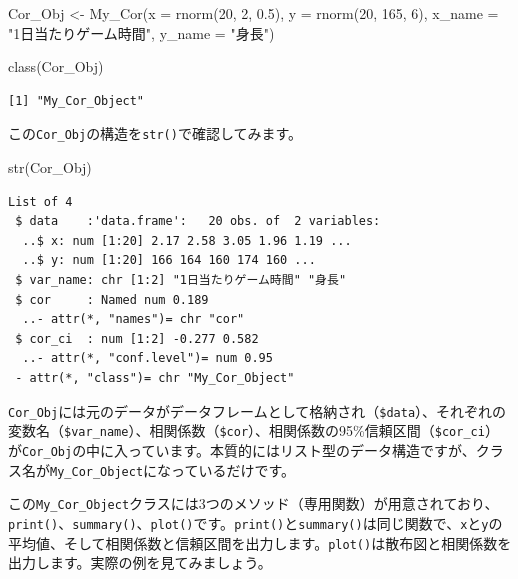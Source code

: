 \documentclass[
  a4paper,
  pandoc,
  ja=standard,
  jafont=haranoaji]{bxjsbook}
\newenvironment{Shaded}{\begin{snugshade}}{\end{snugshade}}
\newcommand{\AttributeTok}[1]{\textcolor[rgb]{0.00,0.48,0.65}{#1}}
\newcommand{\DecValTok}[1]{\textcolor[rgb]{0.68,0.00,0.00}{#1}}
\newcommand{\FloatTok}[1]{\textcolor[rgb]{0.68,0.00,0.00}{#1}}
\newcommand{\FunctionTok}[1]{\textcolor[rgb]{0.28,0.35,0.67}{#1}}
\newcommand{\NormalTok}[1]{\textcolor[rgb]{0.00,0.48,0.65}{#1}}
\newcommand{\OtherTok}[1]{\textcolor[rgb]{0.00,0.48,0.65}{#1}}
\newcommand{\StringTok}[1]{\textcolor[rgb]{0.13,0.47,0.30}{#1}}
\begin{document}
\begin{Shaded}
\begin{Highlighting}[numbers=left,,]
\NormalTok{Cor\_Obj }\OtherTok{\textless{}{-}} \FunctionTok{My\_Cor}\NormalTok{(}\AttributeTok{x      =} \FunctionTok{rnorm}\NormalTok{(}\DecValTok{20}\NormalTok{, }\DecValTok{2}\NormalTok{, }\FloatTok{0.5}\NormalTok{), }
                  \AttributeTok{y      =} \FunctionTok{rnorm}\NormalTok{(}\DecValTok{20}\NormalTok{, }\DecValTok{165}\NormalTok{, }\DecValTok{6}\NormalTok{), }
                  \AttributeTok{x\_name =} \StringTok{"1日当たりゲーム時間"}\NormalTok{, }
                  \AttributeTok{y\_name =} \StringTok{"身長"}\NormalTok{)}

\FunctionTok{class}\NormalTok{(Cor\_Obj)}
\end{Highlighting}
\end{Shaded}

\begin{verbatim}
[1] "My_Cor_Object"
\end{verbatim}

この\texttt{Cor\_Obj}の構造を\texttt{str()}で確認してみます。

\begin{Shaded}
\begin{Highlighting}[numbers=left,,]
\FunctionTok{str}\NormalTok{(Cor\_Obj)}
\end{Highlighting}
\end{Shaded}

\begin{verbatim}
List of 4
 $ data    :'data.frame':   20 obs. of  2 variables:
  ..$ x: num [1:20] 2.17 2.58 3.05 1.96 1.19 ...
  ..$ y: num [1:20] 166 164 160 174 160 ...
 $ var_name: chr [1:2] "1日当たりゲーム時間" "身長"
 $ cor     : Named num 0.189
  ..- attr(*, "names")= chr "cor"
 $ cor_ci  : num [1:2] -0.277 0.582
  ..- attr(*, "conf.level")= num 0.95
 - attr(*, "class")= chr "My_Cor_Object"
\end{verbatim}

\texttt{Cor\_Obj}には元のデータがデータフレームとして格納され（\texttt{\$data}）、それぞれの変数名（\texttt{\$var\_name}）、相関係数（\texttt{\$cor}）、相関係数の95\%信頼区間（\texttt{\$cor\_ci}）が\texttt{Cor\_Obj}の中に入っています。本質的にはリスト型のデータ構造ですが、クラス名が\texttt{My\_Cor\_Object}になっているだけです。

この\texttt{My\_Cor\_Object}クラスには3つのメソッド（専用関数）が用意されており、\texttt{print()}、\texttt{summary()}、\texttt{plot()}です。\texttt{print()}と\texttt{summary()}は同じ関数で、\texttt{x}と\texttt{y}の平均値、そして相関係数と信頼区間を出力します。\texttt{plot()}は散布図と相関係数を出力します。実際の例を見てみましょう。
\end{document}

